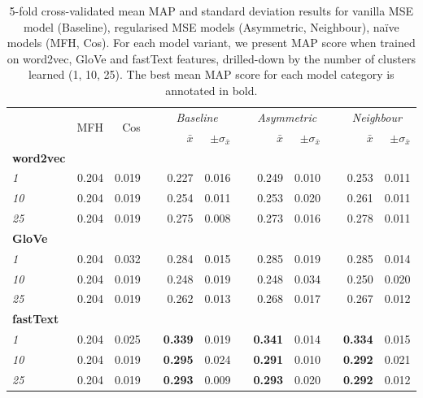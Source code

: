 \begin{table}\centering
\begin{tabular}{@{}lrrcrrcrrcrr@{}}\toprule
& \multirow{2}{*}{MFH} & \multirow{2}{*}{Cos} & \phantom{a} &  \multicolumn{2}{c}{\textit{Baseline}} & \phantom{a} & \multicolumn{2}{c}{\textit{Asymmetric}} & \phantom{a} & \multicolumn{2}{c}{\textit{Neighbour}}\\
\cmidrule{5-6} \cmidrule{8-9} \cmidrule{11-12}
&  &  && $\bar{x}$ & $\pm\sigma_{\bar{x}}$ && $\bar{x}$ & $\pm\sigma_{\bar{x}}$ && $\bar{x}$ & $\pm\sigma_{\bar{x}}$ \\ \midrule
\textbf{word2vec}\\
\textit{1} & 0.204 & 0.019 && 0.227 & 0.016 && 0.249 & 0.010 && 0.253 & 0.011 \\
\textit{10} & 0.204 & 0.019 && 0.254 & 0.011 && 0.253 & 0.020 && 0.261 & 0.011 \\
\textit{25} & 0.204 & 0.019 && 0.275 & 0.008 && 0.273 & 0.016 && 0.278 & 0.011 \\
\cmidrule{2-12}
\textbf{GloVe}\\
\textit{1} & 0.204 & 0.032 && 0.284 & 0.015 && 0.285 & 0.019 && 0.285 & 0.014 \\
\textit{10} & 0.204 & 0.019 && 0.248 & 0.019 && 0.248 & 0.034 && 0.250 & 0.020 \\
\textit{25} & 0.204 & 0.019 && 0.262 & 0.013 && 0.268 & 0.017 && 0.267 & 0.012 \\
\cmidrule{2-12}
\textbf{fastText}\\
\textit{1} & 0.204 & 0.025 && \textbf{0.339} & 0.019 && \textbf{0.341} & 0.014 && \textbf{0.334} & 0.015 \\
\textit{10} & 0.204 & 0.019 && \textbf{0.295} & 0.024 && \textbf{0.291} & 0.010 && \textbf{0.292} & 0.021 \\
\textit{25} & 0.204 & 0.019 && \textbf{0.293} & 0.009 && \textbf{0.293} & 0.020 && \textbf{0.292} & 0.012 \\
\bottomrule
\end{tabular}
\caption[5-fold cross-validated mean MAP results for MSE model variants trained on three embeddings spaces]{5-fold cross-validated mean MAP and standard deviation results for vanilla MSE model (Baseline), regularised MSE models (Asymmetric, Neighbour), na\"ive models (MFH, Cos).  For each model variant, we present MAP score when trained on word2vec, GloVe and fastText features, drilled-down by the number of clusters learned (1, 10, 25).  The best mean MAP score for each model category is annotated in bold.}
\label{tab:map_mse}
\end{table}

